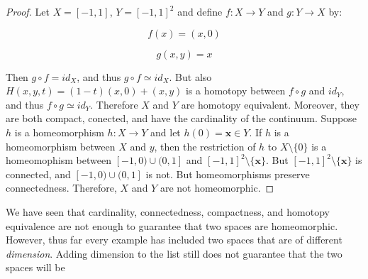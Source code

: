 \documentclass[crop=false,class=book,oneside]{standalone}                      %
\begin{document}
            \begin{proof}
                Let $X=[-1,1]$, $Y=[-1,1]^{2}$ and define
                $f:X\rightarrow{Y}$ and $g:Y\rightarrow{X}$ by:
                \par
                \begin{minipage}[b]{0.49\textwidth}
                    \centering
                    \begin{equation}
                        f(x)=(x,0)
                    \end{equation}
                \end{minipage}
                \hfill
                \begin{minipage}[b]{0.49\textwidth}
                    \centering
                    \begin{equation}
                        g(x,y)=x
                    \end{equation}
                \end{minipage}
                \par\hfill\par
                Then $g\circ{f}=id_{X}$, and thus
                $g\circ{f}\simeq{id_{X}}$. But also
                $H(x,y,t)=(1-t)(x,0)+(x,y)$ is a homotopy
                between $f\circ{g}$ and $id_{Y}$, and thus
                $f\circ{g}\simeq{id_{Y}}$. Therefore $X$ and $Y$
                are homotopy equivalent. Moreover, they are both
                compact, conected, and have the cardinality
                of the continuum.
                Suppose $h$ is a homeomorphism $h:X\rightarrow{Y}$ and
                let $h(0)=\mathbf{x}\in{Y}$. If $h$ is a homeomorphism
                between $X$ and $y$, then the restriction of
                $h$ to $X\setminus\{0\}$ is a homeomophism
                between $[-1,0)\cup(0,1]$ and
                $[-1,1]^{2}\setminus\{\mathbf{x}\}$. But
                $[-1,1]^{2}\setminus\{\mathbf{x}\}$ is connected,
                and $[-1,0)\cup(0,1]$ is not. But homeomorphisms
                preserve connectedness. Therefore, $X$ and
                $Y$ are not homeomorphic.
            \end{proof}
            We have seen that cardinality, connectedness,
            compactness, and homotopy equivalence are not enough to
            guarantee that two spaces are homeomorphic. However, thus far
            every example has included two spaces that are of
            different \textit{dimension}. Adding dimension to the list
            still does not guarantee that the two spaces will be
\end{document}
